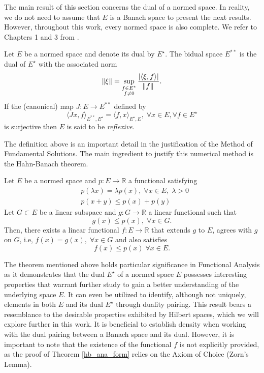 The main result of this section concerns the dual of a normed space. In reality, we do not need to assume that \(E\) is a Banach space to present the next results. However, throughout this work, every normed space is also complete. We refer to Chapters 1 and 3 from \cite{brezis2011functional}.
\begin{definition}\label{reflexive_space}
    Let \(E\) be a normed space and denote its dual by \(E^\star\). The bidual space \(E^{**}\) is the dual of \(E^\star\) with the associated norm
    \[
        \norm{\xi} = \sup_{\substack{f \in E^\star\\ f \neq 0}}\frac{\abs{\langle \xi, f \rangle}}{\norm*{f}}.
    \]
    If the (canonical) map \(J: E \rightarrow E^{**}\) defined by
    \[
        \langle J x, f \rangle_{E^{**}, E^\star} = \langle f, x \rangle_{E^\star, E}, \; \forall x \in E, \forall f \in E^\star
    \]
    is surjective then \(E\) is said to be \textit{reflexive}.
\end{definition}
The definition above is an important detail in the justification of the Method of Fundamental Solutions. The main ingredient to justify this numerical method is the Hahn-Banach theorem.
\begin{theorem}\label{hb_ana_form}
    Let \(E\) be a normed space and \(p: E \rightarrow \mathbb{R}\) a functional satisfying
    \begin{align*}
        &p (\lambda x) = \lambda p(x), \; \forall x \in E, \; \lambda >0\\
        &p(x+y) \leq p(x) + p(y)
    \end{align*}
    Let \(G \subset E\) be a linear subspace and \(g: G \rightarrow \mathbb{R}\) a linear functional such that
    \[
        g(x) \leq p(x), \; \forall x \in G.
    \]
    Then, there exists a linear functional \(f: E \rightarrow \mathbb{R}\) that extends \(g\) to \(E\), agrees with \(g\) on \(G\), i.e, \(f(x) = g(x), \; \forall x \in G\) and also satisfies
    \[
        f(x) \leq p(x) \; \forall x \in E.
    \]
\end{theorem}
\begin{remark}
    The theorem mentioned above holds particular significance in Functional Analysis as it demonstrates that the dual \(E^\star\) of a normed space \(E\) possesses interesting properties that warrant further study to gain a better understanding of the underlying space \(E\). It can even be utilized to identify, although not uniquely, elements in both \(E\) and its dual \(E^\star\) through duality pairing. This result bears a resemblance to the desirable properties exhibited by Hilbert spaces, which we will explore further in this work. It is beneficial to establish density when working with the dual pairing between a Banach space and its dual. However, it is important to note that the existence of the functional \(f\) is not explicitly provided, as the proof of Theorem \ref{hb_ana_form} relies on the Axiom of Choice (Zorn's Lemma).
\end{remark}
